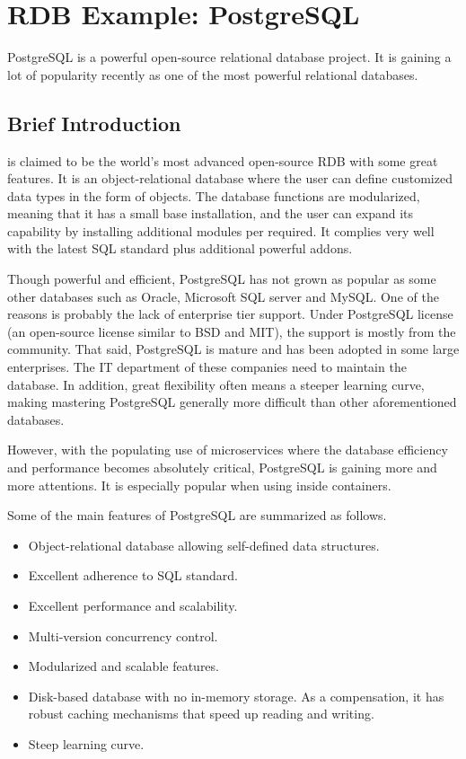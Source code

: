

\chapter{RDB Example: PostgreSQL}

PostgreSQL is a powerful open-source relational database project. It is gaining a lot of popularity recently as one of the most powerful relational databases.

\section{Brief Introduction}

 is claimed to be the world's most advanced open-source RDB with some great features. It is an object-relational database where the user can define customized data types in the form of objects. The database functions are modularized, meaning that it has a small base installation, and the user can expand its capability by installing additional modules per required. It complies very well with the latest SQL standard plus additional powerful addons.

Though powerful and efficient, PostgreSQL has not grown as popular as some other databases such as Oracle, Microsoft SQL server and MySQL. One of the reasons is probably the lack of enterprise tier support. Under PostgreSQL license (an open-source license similar to BSD and MIT), the support is mostly from the community. That said, PostgreSQL is mature and has been adopted in some large enterprises. The IT department of these companies need to maintain the database. In addition, great flexibility often means a steeper learning curve, making mastering PostgreSQL generally more difficult than other aforementioned databases.

However, with the populating use of microservices where the database efficiency and performance becomes absolutely critical, PostgreSQL is gaining more and more attentions. It is especially popular when using inside containers.

Some of the main features of PostgreSQL are summarized as follows.
\begin{itemize}
	\item Object-relational database allowing self-defined data structures.
	\item Excellent adherence to SQL standard.
	\item Excellent performance and scalability.
	\item Multi-version concurrency control.
	\item Modularized and scalable features.
	\item Disk-based database with no in-memory storage. As a compensation, it has robust caching mechanisms that speed up reading and writing.
	\item Steep learning curve.
\end{itemize}

